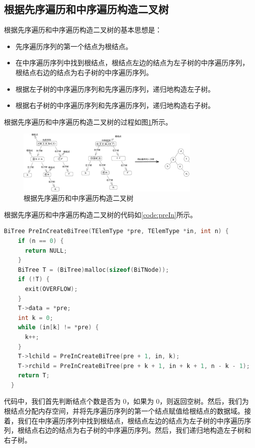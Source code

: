 \documentclass[lang=cn,newtx,10pt,scheme=chinese]{elegantbook}
\begin{document}
\subsection{根据先序遍历和中序遍历构造二叉树}

根据先序遍历和中序遍历构造二叉树的基本思想是：

\begin{itemize}
  \item 先序遍历序列的第一个结点为根结点。
  \item 在中序遍历序列中找到根结点，根结点左边的结点为左子树的中序遍历序列，根结点右边的结点为右子树的中序遍历序列。
  \item 根据左子树的中序遍历序列和先序遍历序列，递归地构造左子树。
  \item 根据右子树的中序遍历序列和先序遍历序列，递归地构造右子树。
  \end{itemize}

根据先序遍历和中序遍历构造二叉树的过程如图\ref{fig:preIn}所示。

\begin{figure}[h]
  \centering
  \includegraphics[width=0.8\textwidth]{./figure/pdf/cropped/pre+in.pdf}
  \caption{根据先序遍历和中序遍历构造二叉树}
  \label{fig:preIn}
\end{figure}

根据先序遍历和中序遍历构造二叉树的代码如\ref{code:preIn}所示。

\begin{lstlisting}[language=C++, caption={根据先序遍历和中序遍历构造二叉树}, label={code:preIn}]
  BiTree PreInCreateBiTree(TElemType *pre, TElemType *in, int n) {
    if (n == 0) {
      return NULL;
    }
    BiTree T = (BiTree)malloc(sizeof(BiTNode));
    if (!T) {
      exit(OVERFLOW);
    }
    T->data = *pre;
    int k = 0;
    while (in[k] != *pre) {
      k++;
    }
    T->lchild = PreInCreateBiTree(pre + 1, in, k);
    T->rchild = PreInCreateBiTree(pre + k + 1, in + k + 1, n - k - 1);
    return T;
  }
\end{lstlisting}

代码中，我们首先判断结点个数是否为 0，如果为 0，则返回空树。然后，我们为根结点分配内存空间，并将先序遍历序列的第一个结点赋值给根结点的数据域。接着，我们在中序遍历序列中找到根结点，根结点左边的结点为左子树的中序遍历序列，根结点右边的结点为右子树的中序遍历序列。然后，我们递归地构造左子树和右子树。
\end{document}
